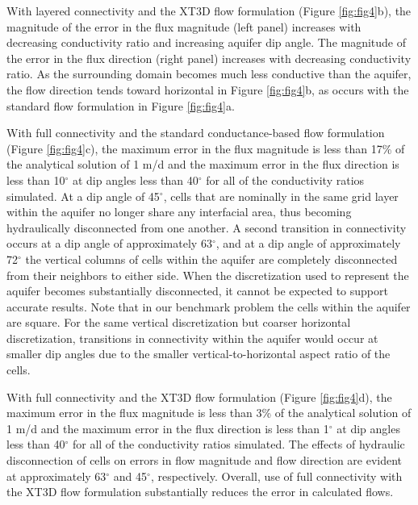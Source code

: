 \documentclass{article}
\begin{document}
With layered connectivity and the XT3D flow formulation (Figure \ref{fig:fig4}b), the magnitude of the error in the flux magnitude (left panel) increases with decreasing conductivity ratio and increasing aquifer dip angle. The magnitude of the error in the flux direction (right panel) increases with decreasing conductivity ratio. As the surrounding domain becomes much less conductive than the aquifer, the flow direction tends toward horizontal in Figure \ref{fig:fig4}b, as occurs with the standard flow formulation in Figure \ref{fig:fig4}a.

With full connectivity and the standard conductance-based flow formulation (Figure \ref{fig:fig4}c), the maximum error in the flux magnitude is less than 17\% of the analytical solution of 1 m/d and the maximum error in the flux direction is less than 10$^{\circ}$ at dip angles less than 40$^{\circ}$ for all of the conductivity ratios simulated. At a dip angle of  45$^{\circ}$, cells that are nominally in the same grid layer within the aquifer no longer share any interfacial area, thus becoming hydraulically disconnected from one another. A second transition in connectivity occurs at a dip angle of approximately 63$^{\circ}$, and at a dip angle of approximately 72$^{\circ}$ the vertical columns of cells within the aquifer are completely disconnected from their neighbors to either side. When the discretization used to represent the aquifer becomes substantially disconnected, it cannot be expected to support accurate results. Note that in our benchmark problem the cells within the aquifer are square. For the same vertical discretization but coarser horizontal discretization, transitions in connectivity within the aquifer would occur at smaller dip angles due to the smaller vertical-to-horizontal aspect ratio of the cells.

With full connectivity and the XT3D flow formulation (Figure \ref{fig:fig4}d), the maximum error in the flux magnitude is less than 3\% of the analytical solution of 1 m/d and the maximum error in the flux direction is less than 1$^{\circ}$ at dip angles less than 40$^{\circ}$ for all of the conductivity ratios simulated. The effects of hydraulic disconnection of cells on errors in flow magnitude and flow direction are evident at approximately 63$^{\circ}$ and 45$^{\circ}$, respectively. Overall, use of full connectivity with the XT3D flow formulation substantially reduces the error in calculated flows.
\end{document}
